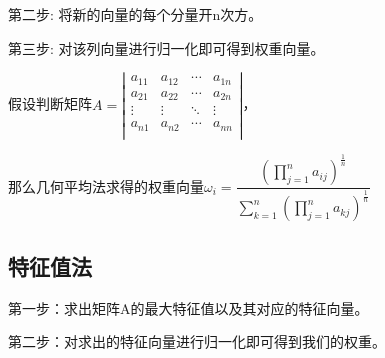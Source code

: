 \documentclass[a4paper]{article}
\begin{document}
    第二步: 将新的向量的每个分量开n次方。
    
    第三步: 对该列向量进行归一化即可得到权重向量。
    
    假设判断矩阵$ A= 
    \left| \begin{matrix}
        a_{11}&		a_{12}&		\cdots&		a_{1n}\\
        a_{21}&		a_{22}&		\cdots&		a_{2n}\\
        \vdots&		\vdots&		\ddots&		\vdots\\
        a_{n1}&		a_{n2}&		\cdots&		a_{nn}\\
    \end{matrix} \right|
    $，
    
    那么几何平均法求得的权重向量$ \omega_{i} =
    \dfrac{\left( \prod\limits_{j=1}^n{a_{ij}} \right) ^{\frac{1}{n}}}{\sum\limits_{k=1}^n{\left( \prod\limits_{j=1}^n{a_{kj}} \right) ^{\frac{1}{n}}}}
    $

    \subsection{特征值法}
    第一步：求出矩阵A的最大特征值以及其对应的特征向量。
    
    第二步：对求出的特征向量进行归一化即可得到我们的权重。
\end{document}
